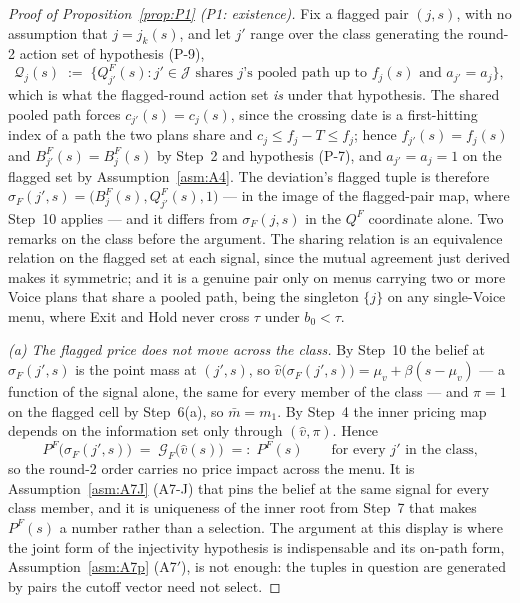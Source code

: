 \begin{proof}[Proof of Proposition~\ref{prop:P1} (P1: existence)]
Fix a flagged pair $(j,s)$, with no assumption that $j = j_k(s)$, and let $j'$ range over the class
generating the round-2 action set of hypothesis (P-9),
\[
\mathcal Q_j(s) \;:=\; \bigl\{Q_{j'}^F(s) : j' \in \mathcal J \text{ shares } j\text{'s pooled path up
to } f_j(s) \text{ and } a_{j'} = a_j\bigr\},
\]
which is what the flagged-round action set \emph{is} under that hypothesis. The shared pooled path
forces $c_{j'}(s) = c_j(s)$, since the crossing date is a first-hitting index of a path the two
plans share and $c_j \le f_j - T \le f_j$; hence $f_{j'}(s) = f_j(s)$ and $B_{j'}^F(s) = B_j^F(s)$ by
Step~2 and hypothesis (P-7), and $a_{j'} = a_j = 1$ on the flagged set by Assumption~\ref{asm:A4}.
The deviation's flagged tuple is therefore $\sigma_F(j',s) = \bigl(B_j^F(s),Q_{j'}^F(s),1\bigr)$ ---
in the image of the flagged-pair map, where Step~10 applies --- and it differs from
$\sigma_F(j,s)$ in the $Q^F$ coordinate alone. Two remarks on the class before the argument. The
sharing relation is an equivalence relation on the flagged set at each signal, since the mutual
agreement just derived makes it symmetric; and it is a genuine pair only on menus carrying two or
more Voice plans that share a pooled path, being the singleton $\{j\}$ on any single-Voice menu,
where Exit and Hold never cross $\tau$ under $b_0 < \tau$.

\emph{(a) The flagged price does not move across the class.} By Step~10 the belief at
$\sigma_F(j',s)$ is the point mass at $(j',s)$, so
$\hat v\bigl(\sigma_F(j',s)\bigr) = \mu_v + \beta(s-\mu_v)$ --- a function of the signal alone, the
same for every member of the class --- and $\pi = 1$ on the flagged cell by Step~6(a), so
$\bar m = m_1$. By Step~4 the inner pricing map depends on the information set only through
$(\hat v,\pi)$. Hence
\begin{equation}
\label{eq:P1-PFinv}
P^F\bigl(\sigma_F(j',s)\bigr) \;=\; \mathcal G_F\bigl(\hat v(s)\bigr) \;=:\; P^F(s)
\qquad \text{for every } j' \text{ in the class,}
\end{equation}
so the round-2 order carries no price impact across the menu. It is Assumption~\ref{asm:A7J} (A7-J) that
pins the belief at the same signal for every class member, and it is uniqueness of the inner root
from Step~7 that makes $P^F(s)$ a number rather than a selection. The argument at this display is
where the joint form of the injectivity hypothesis is indispensable and its on-path form,
Assumption~\ref{asm:A7p} (A7$'$), is not enough: the tuples in question are generated by pairs the cutoff
vector need not select.


\end{proof}
